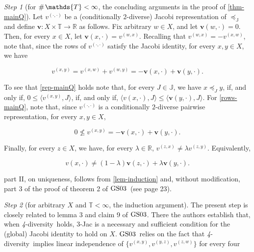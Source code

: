 \documentclass[ecta,nameyear,draft]{econsocart}
\newcommand{\countof}{\mathbin{\#}\hskip1pt}
\newcommand{\R}{\mathbb R}
\newcommand{\mbbt}{{\mathds {T}}}
\newcommand{\mbbj}{\mathds J}
\newcommand{\xy}{{(x, y)}}
\newcommand{\yz}{{(y,z)}}
\newcommand{\zy}{{(z,y)}}
\newcommand{\zx}{{(z,x)}}
\newcommand{\xw}{{(x,w)}}
\newcommand{\wx}{{(w,x)}}
\newcommand{\wy}{{(w,y)}}
\newcommand{\zw}{(z,w)}
\newcommand{\dd}{{(\cdot,\cdot)}}
\newcommand{\fourdiv}{\textit{4}-\textup{diversity}}
\newcommand{\gsii}{$\textup{GS03}$}
\theoremstyle{plain}
\theoremstyle{remark}
\newtheorem{step}{Step}[section]
\begin{document}
\begin{appendix}
\begin{step}[for $\countof \mbbt < \infty$, the concluding arguments in the
    proof of
    \cref{thm-mainQ}]
    Let $v^{\dd}$ be a (conditionally $2$-diverse) Jacobi representation of
    $\preceq_{\mbbj}$ and define $\mathbf{v}: X\times \mbbt \rightarrow \R$ as
    follows. Fix arbitrary $w\in X$, and let $\mathbf{v}(w,\cdot) = 0$. Then, for
    every $x\in X$, let $\mathbf{v}(x,\cdot) = v^{\wx}$. Recalling that $v^{\wx}=
    -v^{\xw}$, note that, since the rows of $v^{\dd}$ satisfy the Jacobi
    identity, for every $x,y\in X$, we have
  \begin{linenomath*}
      \begin{equation*}v^{\xy}= v^{\xw}+v^{\wy} = -\mathbf{v}(x,\cdot) +
      \mathbf{v}(y,\cdot).\end{equation*}
  \end{linenomath*}
  To see that \ref{rep-mainQ} holds note that, for every $J\in \mbbj$, we have $x
    \preceq_{J} y$, if, and only if, $0 \leq \langle v^{\xy}, J \rangle$, if, and
    only if, $\langle v(x,\cdot), J \rangle \leq \langle \mathbf{v}(y,\cdot), J
    \rangle$.  For \ref{rows-mainQ}, note that, since $v^{\dd}$ is a
    conditionally $2$-diverse pairwise representation, for every $x,y\in X$,
  \begin{linenomath*}
    \begin{equation*}0 \not \leq v^{\xy} = - \mathbf{v}(x,\cdot) +
    \mathbf{v}(y,\cdot).\end{equation*}
  \end{linenomath*} 
  Finally, for every $z\in X$, we have, for every $\lambda \in \R$, $v^{\zx} \neq
    \lambda v^{\zy}$. Equivalently,
  \begin{linenomath*}
    \begin{equation*} v(x,\cdot) \neq (1-\lambda) \mathbf{v}(z,\cdot ) + \lambda
      \mathbf{v}(y,\cdot) . \end{equation*}
  \end{linenomath*}
   part II, on uniqueness, follows from \cref{lem-induction} and,
    without modification, part 3 of the proof of theorem 2 of \gsii\ (see page
    23).
  \end{step}
  \begin{step}[for arbitrary $X$ and $\mbbt < \infty$, the induction
    argument]\label{step-induction} The present step is closely related to lemma
    3 and claim 9 of \gsii. There the authors establish that, when \fourdiv\
    holds, $3$-Jac is a necessary and sufficient condition for the (global)
    Jacobi identity to hold on $X$.  \gsii\ relies on the fact that \fourdiv\
    implies linear independence of $\{v^{\xy},v^{\yz}, v^{\zw}\}$ for every four

\end{step}
\end{appendix}
\end{document}

